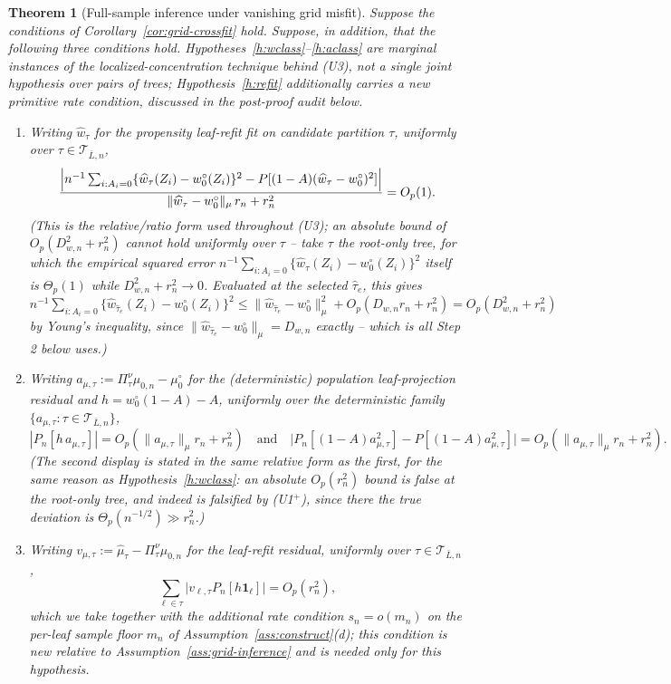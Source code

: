 \documentclass[11pt]{article}
\theoremstyle{plain}
\newtheorem{theorem}{Theorem}[section]
\theoremstyle{definition}
\theoremstyle{remark}
\newcommand{\cT}{\mathcal{T}}
\newcommand{\mz}{\mu_0}
\newcommand{\mzn}{\mu_{0,n}}
\begin{document}
\begin{theorem}[Full-sample inference under vanishing grid misfit]
\label{thm:grid-fullsample}
Suppose the conditions of Corollary~\ref{cor:grid-crossfit} hold. Suppose,
in addition, that the following three conditions hold.
Hypotheses~\ref{h:wclass}--\ref{h:aclass} are marginal instances of the
localized-concentration technique behind (U3), not a single joint
hypothesis over pairs of trees; Hypothesis~\ref{h:refit} additionally
carries a new primitive rate condition, discussed in the post-proof audit
below.

\begin{enumerate}[label=(H\arabic*),leftmargin=*]
\item\label{h:wclass} Writing $\widehat w_\tau$ for the propensity
leaf-refit fit on candidate partition $\tau$, uniformly over
$\tau\in\cT_{\bar L,n}$,
\[
  \frac{\Bigl|n^{-1}\sum_{i:A_i=0}\{\widehat w_\tau(Z_i)-w_0^\circ(Z_i)\}^2
  -P[(1-A)(\widehat w_\tau-w_0^\circ)^2]\Bigr|}
  {\|\widehat w_\tau-w_0^\circ\|_\mu\,r_n+r_n^2}=O_p(1).
\]
(This is the relative/ratio form used throughout (U3); an \emph{absolute}
bound of $O_p(D_{w,n}^2+r_n^2)$ cannot hold uniformly over $\tau$ -- take
$\tau$ the root-only tree, for which the empirical squared error
$n^{-1}\sum_{i:A_i=0}\{\widehat w_\tau(Z_i)-w_0^\circ(Z_i)\}^2$ itself is
$\Theta_p(1)$ while $D_{w,n}^2+r_n^2\to0$. Evaluated at the selected
$\widehat\tau_e$, this gives $n^{-1}\sum_{i:A_i=0}\{\widehat w_{\widehat\tau_e}(Z_i)
-w_0^\circ(Z_i)\}^2\le\|\widehat w_{\widehat\tau_e}-w_0^\circ\|_\mu^2
+O_p(D_{w,n}r_n+r_n^2)=O_p(D_{w,n}^2+r_n^2)$ by Young's inequality, since
$\|\widehat w_{\widehat\tau_e}-w_0^\circ\|_\mu=D_{w,n}$ exactly -- which is
all Step 2 below uses.)
\item\label{h:aclass} Writing $a_{\mu,\tau}:=\Pi^\nu_\tau\mzn-\mz^\circ$
for the (deterministic) population leaf-projection residual and
$h=w_0^\circ(1-A)-A$, uniformly over the deterministic family
$\{a_{\mu,\tau}:\tau\in\cT_{\bar L,n}\}$,
\[
  |P_n[h\,a_{\mu,\tau}]|=O_p(\|a_{\mu,\tau}\|_\mu r_n+r_n^2)
  \quad\text{and}\quad
  \bigl|P_n[(1-A)a_{\mu,\tau}^2]-P[(1-A)a_{\mu,\tau}^2]\bigr|
  =O_p(\|a_{\mu,\tau}\|_\mu r_n+r_n^2).
\]
(The second display is stated in the same relative form as the first, for
the same reason as Hypothesis~\ref{h:wclass}: an absolute $O_p(r_n^2)$ bound
is false at the root-only tree, and indeed is falsified \emph{by}
(U1$^+$), since there the true deviation is $\Theta_p(n^{-1/2})\gg r_n^2$.)
\item\label{h:refit} Writing $v_{\mu,\tau}:=\widehat\mu_\tau-\Pi^\nu_\tau\mzn$
for the leaf-refit residual, uniformly over $\tau\in\cT_{\bar L,n}$,
\[
  \sum_{\ell\in\tau}\bigl|v_{\ell,\tau}P_n[h\mathbf1_\ell]\bigr|=O_p(r_n^2),
\]
which we take together with the additional rate condition $s_n=o(m_n)$ on
the per-leaf sample floor $m_n$ of Assumption~\ref{ass:construct}(d); this
condition is new relative to Assumption~\ref{ass:grid-inference} and is
needed only for this hypothesis.
\end{enumerate}


\end{theorem}
\end{document}
